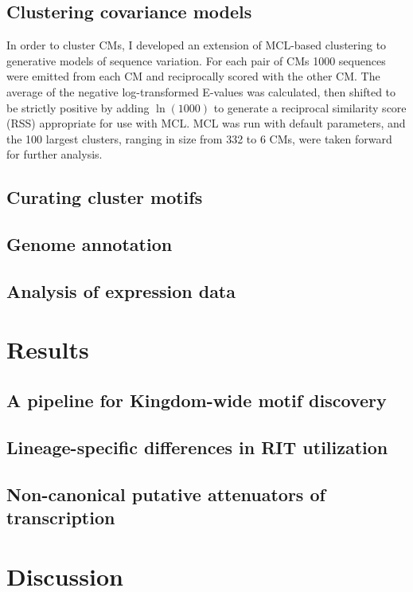 \subsection{Clustering covariance models}

In order to cluster CMs, I developed an extension of MCL-based clustering \parencite{Enright2002} to generative models of sequence variation. For each pair of CMs 1000 sequences were emitted from each CM and reciprocally scored with the other CM. The average of the negative log-transformed E-values was calculated, then shifted to be strictly positive by adding $\ln(1000)$ to generate a reciprocal similarity score (RSS) appropriate for use with MCL. MCL was run with default parameters, and the 100 largest clusters, ranging in size from 332 to 6 CMs, were taken forward for further analysis.

\subsection{Curating cluster motifs}

\subsection{Genome annotation}

\subsection{Analysis of expression data}

\section{Results}

\subsection{A pipeline for Kingdom-wide motif discovery}

\subsection{Lineage-specific differences in RIT utilization}

\subsection{Non-canonical putative attenuators of transcription}

\section{Discussion}
